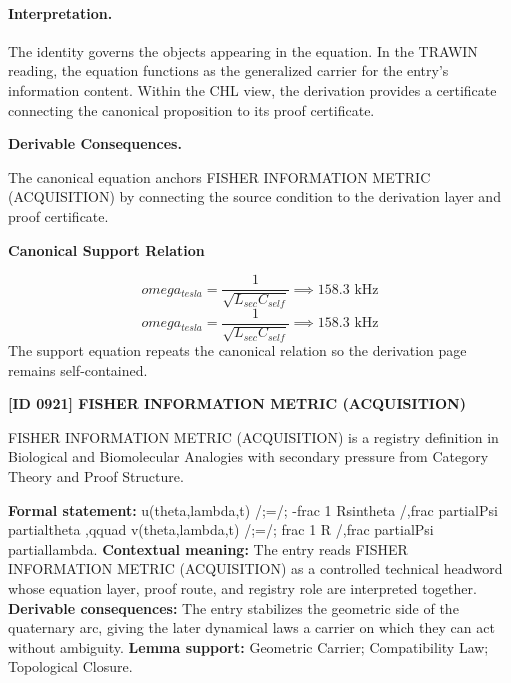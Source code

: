 \paragraph{Interpretation.}
The identity governs the objects appearing in the equation. In the TRAWIN reading, the equation functions as the generalized carrier for the entry’s information content. Within the CHL view, the derivation provides a certificate connecting the canonical proposition to its proof certificate.

\par\vspace{0.35em}
\noindent\textbf{Derivable Consequences.}\quad
\begingroup
\footnotesize
\raggedright
The canonical equation anchors FISHER INFORMATION METRIC (ACQUISITION) by connecting the source condition to the derivation layer and proof certificate.
\par\endgroup

\noindent\textbf{Canonical Support Relation}\par
\[
omega_{tesla} = \frac{1}{\sqrt{L_{sec} C_{self}}} \implies 158.3 \text{ kHz}
\]
\[
omega_{tesla} = \frac{1}{\sqrt{L_{sec} C_{self}}} \implies 158.3 \text{ kHz}
\]
\noindent The support equation repeats the canonical relation so the derivation page remains self-contained.\par

\clearpage
\noindent\textbf{[ID 0921] FISHER INFORMATION METRIC (ACQUISITION)}\par
\vspace{0.35em}
\begingroup\small
{}
FISHER INFORMATION METRIC (ACQUISITION) is a registry definition in Biological and Biomolecular Analogies with secondary pressure from Category Theory and Proof Structure.

\begingroup\footnotesize\setlength{\emergencystretch}{3em}\sloppy
\textbf{Formal statement:} u(theta,lambda,t) /;=/; -frac 1 Rsintheta /,frac partialPsi partialtheta ,qquad v(theta,lambda,t) /;=/; frac 1 R /,frac partialPsi partiallambda. \textbf{Contextual meaning:} The entry reads FISHER INFORMATION METRIC (ACQUISITION) as a controlled technical headword whose equation layer, proof route, and registry role are interpreted together. \textbf{Derivable consequences:} The entry stabilizes the geometric side of the quaternary arc, giving the later dynamical laws a carrier on which they can act without ambiguity. \textbf{Lemma support:} Geometric Carrier; Compatibility Law; Topological Closure.\par
\endgroup

